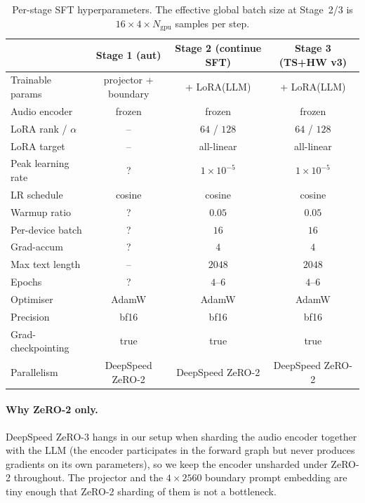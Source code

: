 \begin{table}[t]
  \caption{Per-stage SFT hyperparameters. The effective global batch
    size at Stage~2/3 is $16 \times 4 \times N_\text{gpu}$ samples
    per step.}
  \label{tab:hparams}
  \centering
  \small
  \begin{tabular}{lccc}
    \toprule
    & Stage 1 (aut) & Stage 2 (continue SFT) & Stage 3 (TS+HW v3) \\
    \midrule
    Trainable params       & projector + boundary & + LoRA(LLM)        & + LoRA(LLM) \\
    Audio encoder          & frozen               & frozen             & frozen \\
    LoRA rank / $\alpha$   & --                   & $64$ / $128$       & $64$ / $128$ \\
    LoRA target            & --                   & all-linear         & all-linear \\
    Peak learning rate     & ?                    & $1\!\times\!10^{-5}$ & $1\!\times\!10^{-5}$ \\
    LR schedule            & cosine               & cosine             & cosine \\
    Warmup ratio           & ?                    & $0.05$             & $0.05$ \\
    Per-device batch       & ?                    & $16$               & $16$ \\
    Grad-accum             & ?                    & $4$                & $4$ \\
    Max text length        & --                   & $2048$             & $2048$ \\
    Epochs                 & ?                    & $4$--$6$           & $4$--$6$ \\
    Optimiser              & AdamW                & AdamW              & AdamW \\
    Precision              & bf16                 & bf16               & bf16 \\
    Grad-checkpointing     & true                 & true               & true \\
    Parallelism            & DeepSpeed ZeRO-2     & DeepSpeed ZeRO-2   & DeepSpeed ZeRO-2 \\
    \bottomrule
  \end{tabular}
\end{table}

\paragraph{Why ZeRO-2 only.}
DeepSpeed ZeRO-3 hangs in our setup when sharding the audio encoder
together with the LLM (the encoder participates in the forward graph
but never produces gradients on its own parameters), so we keep the
encoder unsharded under ZeRO-2 throughout. The projector and the
$4\!\times\!2560$ boundary prompt embedding are tiny enough that
ZeRO-2 sharding of them is not a bottleneck.


